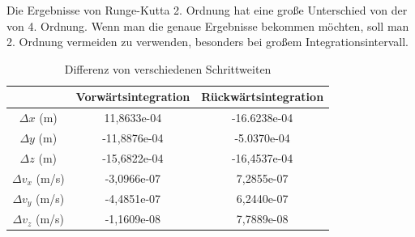 Die Ergebnisse von Runge-Kutta 2. Ordnung hat eine große Unterschied von der von 4. Ordnung. Wenn man die genaue Ergebnisse bekommen möchten, soll man 2. Ordnung vermeiden zu verwenden, besonders bei großem Integrationsintervall.
\begin{table}[h]\centering
	\begin{tabular}{|c|c|c|}
		\hline
		& Vorwärtsintegration & Rückwärtsintegration \\ \hline
		$\Delta x$ (m)     & 11,8633e-04 & -16.6238e-04 \\ \hline
		$\Delta y$ (m)     & -11,8876e-04  & -5.0370e-04  \\ \hline
		$\Delta z$ (m)     & -15,6822e-04 & -16,4537e-04 \\ \hline
		$\Delta v_x$ (m/s) & -3,0966e-07 & 7,2855e-07 \\ \hline
		$\Delta v_y$ (m/s) & -4,4851e-07 & 6,2440e-07 \\ \hline
		$\Delta v_z$ (m/s) & -1,1609e-08 & 7,7889e-08 \\ \hline
	\end{tabular}
	\caption{Differenz von verschiedenen Schrittweiten}
	\label{tab:diff1}
\end{table}
